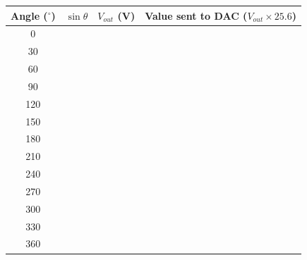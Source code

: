 \begin{procedure}
  \begin{boxedtable}
    \label{tab:exp6-sine}
    {\renewcommand{\arraystretch}{1.45}
      \centering
      \begin{tabular}{cccc}
        \toprule
        Angle ($^\circ$) & $\sin\theta$ & $V_{out}$ (V) & Value sent to DAC ($V_{out}\times 25.6$) \\
        \midrule
        0                &              &               &                                          \\
        30               &              &               &                                          \\
        60               &              &               &                                          \\
        90               &              &               &                                          \\
        120              &              &               &                                          \\
        150              &              &               &                                          \\
        180              &              &               &                                          \\
        210              &              &               &                                          \\
        240              &              &               &                                          \\
        270              &              &               &                                          \\
        300              &              &               &                                          \\
        330              &              &               &                                          \\
        360              &              &               &                                          \\
        \bottomrule
      \end{tabular}
    }
  \end{boxedtable}

\end{procedure}
